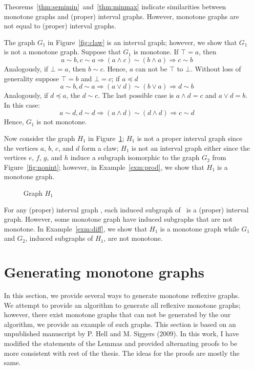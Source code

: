 Theorems~\ref{thm:semimin}~and~\ref{thm:minmax} indicate similarities between
monotone graphs and (proper) interval graphs. However, monotone graphs are not
equal to (proper) interval graphs.

\begin{example} \label{exm:diff}
The graph \(G_1\) in Figure~\ref{fig:claw} is an interval graph; however, we show that \(G_1\) is not a monotone graph.
Suppose that \(G_1\) is monotone. If \(\top = a\), then
\[a \sim b, c \sim a \Rightarrow (a \wedge c) \sim (b \wedge a) \Rightarrow c \sim b\]
Analogously, if \(\bot = a\), then \(b \sim c\)\@. Hence, \(a\) can not be \(\top\) to \(\bot\)\@.
Without loss of generality suppose \(\top = b\) and \(\bot = c\); if \(a \preceq d\)
\[a \sim b, d \sim a \Rightarrow (a \vee d) \sim (b \vee a) \Rightarrow d \sim b\]
Analogously, if \(d \preceq a\), the \(d \sim c\)\@. The last possible case is 
\(a \wedge d = c\) and \(a \vee d = b\). In this case:
\[a \sim d, d \sim d \Rightarrow (a \wedge d) \sim (d \wedge d) \Rightarrow c \sim d\]
Hence, \(G_1\) is not monotone. 

Now consider the graph \(H_1\) in Figure~\ref{fig:monnotpint};
\(H_1\) is not a proper interval graph since the vertices \(a\), \(b\), \(c\), and \(d\) form a claw;
\(H_1\) is not an interval graph either since the vertices \(e\), \(f\), \(g\), and \(h\) induce a subgraph isomorphic to the graph \(G_2\)
from Figure~\ref{fig:nonint}; however, in Example~\ref{exm:prod},
we show that \(H_1\) is a monotone graph.

\begin{figure}[h]
\center

\caption{Graph \ensuremath{H_1}} \label{fig:monnotpint}
\end{figure}
\end{example}

For any (proper) interval graph \mH, each induced subgraph of \mH\ is a 
(proper) interval graph. However, some monotone graph have induced subgraphs that are not monotone.
In Example~\ref{exm:diff}, we show that \(H_1\) is a monotone graph while \(G_1\) and \(G_2\), induced subgraphs of \(H_1\), are
not monotone.

\section{Generating monotone graphs}
In this section, we provide several ways to generate monotone reflexive graphs.
We attempt to provide an algorithm to generate all reflexive monotone graphs;
however, there exist monotone graphs that can not be generated by the our algorithm,
we provide an example of such graphs. This section is based on an unpublished
manuscript by P. Hell and M. Siggers (2009)\@. In this work, I have modified the
statements of the Lemmas and provided alternating proofs to be more consistent with
rest of the thesis. The ideas for the proofs are mostly the same.


